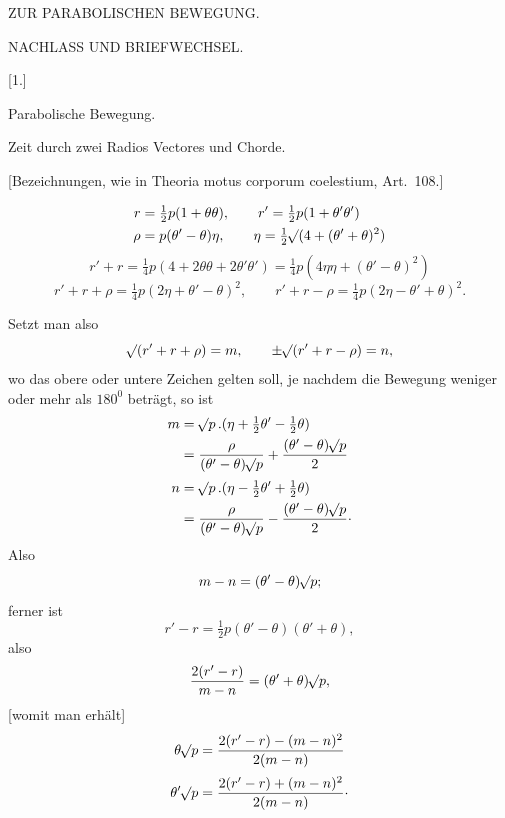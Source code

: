 \clearpage
\thispagestyle{empty}
\vspace*{1.6in}
\begin{center}
{\Large ZUR PARABOLISCHEN BEWEGUNG.\par}
\end{center}
\clearpage
{}
\begin{center}
{\large NACHLASS UND BRIEFWECHSEL.\par}
\par
\medskip
{}[1.]\par
\medskip
Parabolische Bewegung.\par
\medskip

Zeit durch zwei Radios Vectores und Chorde.
\medskip

[Bezeichnungen, wie in Theoria motus corporum coelestium, Art.~108.]
\end{center}
\[
\begin{aligned}
r&=\tfrac{1}{2}p(1+\theta\theta),\qquad r'=\tfrac{1}{2}p(1+\theta'\theta')\\
\rho&=p(\theta'-\theta)\eta,\qquad \eta=\tfrac{1}{2}\mathord{{}^{}\!\surd}(4+(\theta'+\theta)^2)
\end{aligned}
\]
\[
r'+r=\tfrac{1}{4}p(4+2\theta\theta+2\theta'\theta')=\tfrac{1}{4}p(4\eta\eta+(\theta'-\theta)^2)
\]
\[
r'+r+\rho=\tfrac{1}{4}p(2\eta+\theta'-\theta)^2,\qquad
r'+r-\rho=\tfrac{1}{4}p(2\eta-\theta'+\theta)^2.
\]

Setzt man also
\[
\mathord{{}^{}\!\surd}(r'+r+\rho)=m,\qquad \pm\mathord{{}^{}\!\surd}(r'+r-\rho)=n,
\]
wo das obere oder untere Zeichen gelten soll, je nachdem die Bewegung weniger oder mehr als \(180^0\) beträgt, so ist
\[
\begin{aligned}
m&=\mathord{{}^{}\!\surd}p\,.(\eta+\tfrac{1}{2}\theta'-\tfrac{1}{2}\theta)\\
&=\frac{\rho}{(\theta'-\theta)\mathord{{}^{}\!\surd}p}+\frac{(\theta'-\theta)\mathord{{}^{}\!\surd}p}{2}\\[.5ex]
n&=\mathord{{}^{}\!\surd}p\,.(\eta-\tfrac{1}{2}\theta'+\tfrac{1}{2}\theta)\\
&=\frac{\rho}{(\theta'-\theta)\mathord{{}^{}\!\surd}p}-\frac{(\theta'-\theta)\mathord{{}^{}\!\surd}p}{2}\mathpunct{\cdot}
\end{aligned}
\]
Also
\[
m-n=(\theta'-\theta)\mathord{{}^{}\!\surd}p;
\]
ferner ist
\[
r'-r=\tfrac{1}{2}p(\theta'-\theta)(\theta'+\theta),
\]
also
\[
\frac{2(r'-r)}{m-n}=(\theta'+\theta)\mathord{{}^{}\!\surd}p,
\]
[womit man erhält]
\[
\begin{aligned}
\theta\mathord{{}^{}\!\surd}p&=\frac{2(r'-r)-(m-n)^2}{2(m-n)}\\[.5ex]
\theta'\mathord{{}^{}\!\surd}p&=\frac{2(r'-r)+(m-n)^2}{2(m-n)}\mathpunct{\cdot}
\end{aligned}
\]

